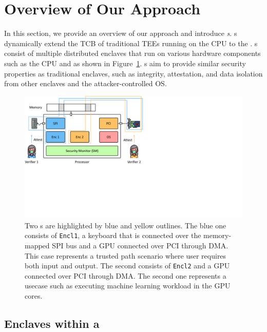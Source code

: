 \section{Overview of Our Approach}
\label{sec:overview}


In this section, we provide an overview of our approach \name and introduce \emph{\nameenclave{}s}. \Nameenclave{}s dynamically extend the TCB of traditional TEEs running on the CPU to the \sphw. \Nameenclave{}s consist of multiple distributed enclaves that run on various hardware components such as the CPU and \sphw as shown in Figure~\ref{fig:new_system}. \Nameenclave{}s aim to provide similar security properties as traditional enclaves, such as integrity, attestation, and data isolation from other enclaves and the attacker-controlled OS. 

\begin{figure}[t]
    \centering
	\includegraphics[trim={0 8cm 15cm 0}, clip, width=\linewidth]{chapters/PIE/images/pwe_idea.pdf}
    \caption[\Nameenclave{}s consists of different applications and \sphw]{Two \nameenclave{}s are highlighted by blue and yellow outlines. The blue one consists of \texttt{Encl1}, a keyboard that is connected over the memory-mapped SPI bus and a GPU connected over PCI through DMA. This case represents a trusted path scenario where user requires both input and output. The second consists of \texttt{Encl2} and a GPU connected over PCI through DMA. The second one represents a usecase such as executing machine learning workload in the GPU cores.}
    \label{fig:new_system}
\end{figure}



\subsection{Enclaves within a \nameenclave}
\label{sec:overview:enclaves}

